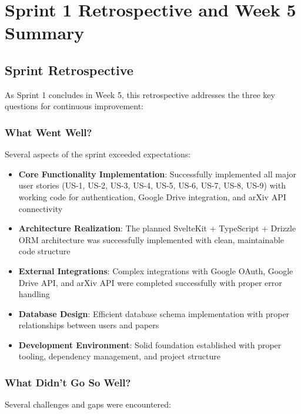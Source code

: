 \documentclass[12pt]{article}
\begin{document}
\section{Sprint 1 Retrospective and Week 5 Summary}

\subsection{Sprint Retrospective}
As Sprint 1 concludes in Week 5, this retrospective addresses the three key questions for continuous improvement:

\subsubsection{What Went Well?}
Several aspects of the sprint exceeded expectations:

\begin{itemize}
  \item \textbf{Core Functionality Implementation}: Successfully implemented all major user stories (US-1, US-2, US-3, US-4, US-5, US-6, US-7, US-8, US-9) with working code for authentication, Google Drive integration, and arXiv API connectivity
  \item \textbf{Architecture Realization}: The planned SvelteKit + TypeScript + Drizzle ORM architecture was successfully implemented with clean, maintainable code structure
  \item \textbf{External Integrations}: Complex integrations with Google OAuth, Google Drive API, and arXiv API were completed successfully with proper error handling
  \item \textbf{Database Design}: Efficient database schema implementation with proper relationships between users and papers
  \item \textbf{Development Environment}: Solid foundation established with proper tooling, dependency management, and project structure
\end{itemize}

\subsubsection{What Didn't Go So Well?}
Several challenges and gaps were encountered:
\end{document}
